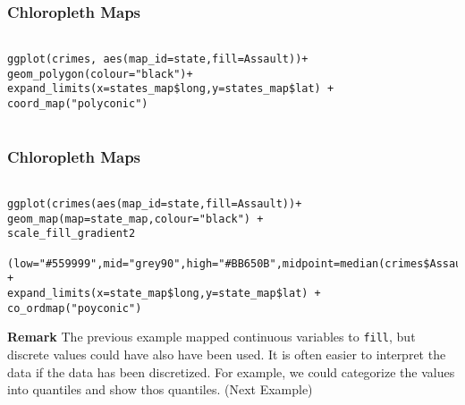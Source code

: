 \documentclass{beamer}
\begin{document}
\begin{frame}
\begin{frame}[fragile]
\frametitle{Chloropleth Maps}
\begin{framed}
\begin{verbatim}

ggplot(crimes, aes(map_id=state,fill=Assault))+ 
geom_polygon(colour="black")+
expand_limits(x=states_map$long,y=states_map$lat) + 
coord_map("polyconic")


\end{verbatim}
\end{framed}
\end{frame}
\begin{frame}[fragile]
\frametitle{Chloropleth Maps}
\begin{framed}
\begin{verbatim}

ggplot(crimes(aes(map_id=state,fill=Assault))+
geom_map(map=state_map,colour="black") + 
scale_fill_gradient2
   (low="#559999",mid="grey90",high="#BB650B",midpoint=median(crimes$Assault)) +
expand_limits(x=state_map$long,y=state_map$lat) +
co_ordmap("poyconic")

\end{verbatim}
\end{framed}
\end{frame}
\begin{frame}[fragile]
\textbf{Remark}
The previous example mapped continuous variables to \texttt{fill}, but discrete values could have also have been used. 
It is often easier to interpret the data if the data has been discretized.
For example, we could categorize the values into quantiles and show thos quantiles.
(Next Example)



\end{frame}


\begin{frame}[fragile]
\begin{framed}
\begin{verbatim}


\end{verbatim}
\end{framed}
\end{frame}
\end{frame}
\end{document}
